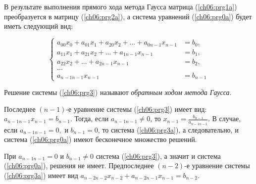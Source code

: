 В результате выполнения прямого хода метода Гаусса матрица (\ref{ch06:prg1a}) преобразуется в матрицу (\ref{ch06:prg2a}), а
система уравнений (\ref{ch06:prg0a}) будет иметь следующий вид:

\begin{equation}\label{ch06:prg3a}
\left\{\begin{array}{rl}
a_{00}x_0+a_{01}x_1+a_{20}x_2+...+a_{0n-1}x_{n-1}&=b_0,\\
a_{11}x_1+a_{21}x_2+...+a_{1n-1}x_{n-1}&=b_1,\\
a_{22}x_2+...+a_{2n-1}x_{n-1}&=b_2,\\
...\\
a_{n-1n-1}x_{n-1}&=b_{n-1}
\end{array}\right.
\end{equation}


Решение системы (\ref{ch06:prg3}) называют \emph{обратным ходом метода Гаусса}.

Последнее $(n-1)$-е уравнение системы (\ref{ch06:prg3}) имеет вид:
 $a_{n-1n-1}x_{n-1}=b_{n-1}$.
Тогда, если  $a_{n-1n-1}\neq 0$, то  $x_{n-1}=\frac{b_{n-1}}{a_{n-1n-1}}$. 
В случае, если  $a_{n-1n-1}=0,$ и $b_{n-1}=0$, то система (\ref{ch06:prg3a}), 
а следовательно, и система (\ref{ch06:prg0a}) имеют бесконечное множество
решений. 

При  $a_{n-1n-1}=0$ и  $b_{n-1}\neq 0$  система (\ref{ch06:prg3}), а значит и система (\ref{ch06:prg0a}), решения не
имеет.
Предпоследнее $(n-2)$-е уравнение системы (\ref{ch06:prg3a}) имеет вид
$a_{n-2n-2}x_{n-2}+a_{n-2n-1}x_{n-1}=b_{n-2}$.


